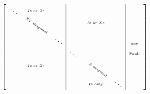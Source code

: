 \documentclass[]{standalone}
\begin{document}
$\left[
\begin{array}{ccc|ccc|c}
  \ddots & ^{\scriptscriptstyle I\text{s or }Z\text{s}} &&&&&  \\
  & {\rotatebox[origin=c]{-35}{$\scriptscriptstyle XY\text{ diagonal}$}} &&& ^{\scriptscriptstyle I\text{s or }X\text{s}} && \\
  & & \ddots &&&&{\scriptscriptstyle \text{any}} \\
  &&&\ddots &  &&^{\scriptscriptstyle \text{Pauli}} \\
  & ^{\scriptscriptstyle I\text{s or }Z\text{s}} &&& {\rotatebox[origin=c]{-35}{$\scriptscriptstyle \ \ Z\text{ diagonal}$}} && \\
  &&&& ^{\scriptscriptstyle I\text{s only}} & \ddots &
\end{array}
\right]$
\end{document}
